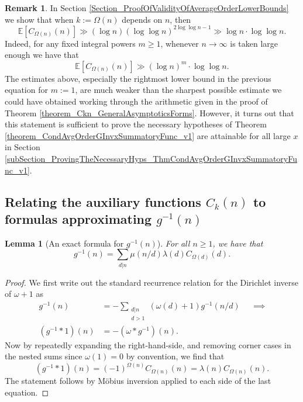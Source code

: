 \documentclass[11pt,reqno,a4letter]{article}
\numberwithin{figure}{section}
\numberwithin{table}{section}
\theoremstyle{plain}
\newtheorem{lemma}[theorem]{Lemma}
\numberwithin{theorem}{section}
\theoremstyle{definition}
\newtheorem{remark}[theorem]{Remark}
\begin{document}
\begin{remark} 
In Section \ref{Section_ProofOfValidityOfAverageOrderLowerBounds} 
we show that when $k := \Omega(n)$ depends on $n$, then 
\[
\mathbb{E}[C_{\Omega(n)}(n)] \gg (\log n) (\log\log n)^{2\log\log n - 1} \gg \log n \cdot \log\log n. 
\] 
Indeed, for any fixed integral powers $m \geq 1$, whenever $n \rightarrow \infty$ is taken large enough 
we have that 
\[
\mathbb{E}[C_{\Omega(n)}(n)] \gg (\log n)^{m} \cdot \log\log n.  
\]
The estimates above, especially the rightmost lower bound in the previous equation for $m := 1$, 
are much weaker than the sharpest possible estimate we could have obtained working through 
the arithmetic given in the proof of 
Theorem \ref{theorem_Ckn_GeneralAsymptoticsForms}. 
However, it turns out that this statement is sufficient to prove the necessary hypotheses of 
Theorem \ref{theorem_CondAvgOrderGInvxSummatoryFunc_v1} 
are attainable for all large $x$ in 
Section \ref{subSection_ProvingTheNecessaryHyps_ThmCondAvgOrderGInvxSummatoryFunc_v1}. 
\end{remark} 

\subsection{Relating the auxiliary functions $C_k(n)$ to formulas approximating $g^{-1}(n)$} 

\begin{lemma}[An exact formula for $g^{-1}(n)$] 
\label{lemma_AnExactFormulaFor_gInvByMobiusInv_v1} 
For all $n \geq 1$, we have that 
\[
g^{-1}(n) = \sum_{d|n} \mu(n/d) \lambda(d) C_{\Omega(d)}(d). 
\]
\end{lemma}
\begin{proof} 
We first write out the standard recurrence relation for the Dirichlet inverse of 
$\omega+1$ as 
\begin{align*} 
g^{-1}(n) & = - \sum_{\substack{d|n \\ d>1}} (\omega(d) + 1) g^{-1}(n/d) && \implies \\ 
     (g^{-1} \ast 1)(n) & = -(\omega \ast g^{-1})(n). 
\end{align*} 
Now by repeatedly expanding the right-hand-side, and removing corner cases in the nested sums since 
$\omega(1) = 0$ by convention, we find that 
\[
(g^{-1} \ast 1)(n) = (-1)^{\Omega(n)} C_{\Omega(n)}(n) = \lambda(n) C_{\Omega(n)}(n). 
\]
The statement follows by M\"obius inversion applied to each side of the last equation. 
\end{proof} 
\end{document}
